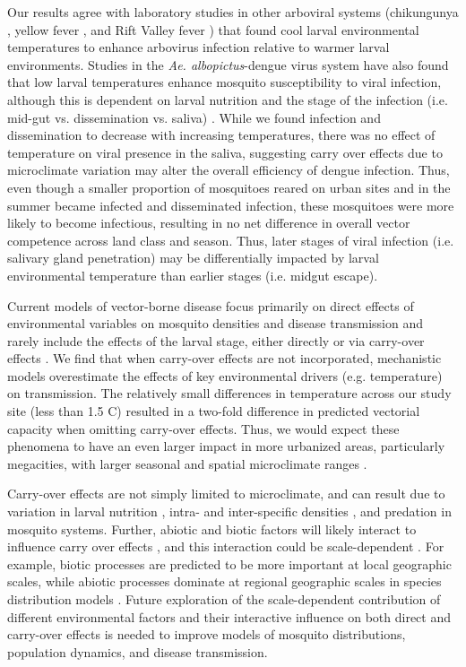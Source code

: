 \documentclass{bmcart}
\begin{document}
Our results agree with laboratory studies in other arboviral systems (chikungunya \citep{adelman2013}, yellow fever \citep{adelman2013}, and Rift Valley fever \citep{turell1993}) that found cool larval environmental temperatures to enhance arbovirus infection relative to warmer larval environments. Studies in the \textit{Ae. albopictus}-dengue virus system have also found that low larval temperatures enhance mosquito susceptibility to viral infection, although this is dependent on larval nutrition \citep{buckner2016} and the stage of the infection (i.e. mid-gut vs. dissemination vs. saliva) \citep{alto2013}. While we found infection and dissemination to decrease with increasing temperatures, there was no effect of temperature on viral presence in the saliva, suggesting carry over effects due to microclimate variation may alter the overall efficiency of dengue infection. Thus, even though a smaller proportion of mosquitoes reared on urban sites and in the summer became infected and disseminated infection, these mosquitoes were more likely to become infectious, resulting in no net difference in overall vector competence across land class and season. Thus, later stages of viral infection (i.e. salivary gland penetration) may be differentially impacted by larval environmental temperature than earlier stages (i.e. midgut escape).

Current models of vector-borne disease focus primarily on direct effects of environmental variables on mosquito densities and disease transmission and rarely include the effects of the larval stage, either directly or via carry-over effects \citep{reiner2013}. We find that when carry-over effects are not incorporated, mechanistic models overestimate the effects of key environmental drivers (e.g. temperature) on transmission. The relatively small differences in temperature across our study site (less than 1.5 \degree C) resulted in a two-fold difference in predicted vectorial capacity when omitting carry-over effects. Thus, we would expect these phenomena to have an even larger impact in more urbanized areas, particularly megacities, with larger seasonal and spatial microclimate ranges \citep{peng2012}.

Carry-over effects are not simply limited to microclimate, and can result due to variation in larval nutrition \citep{moller-jacobs2014}, intra- and inter-specific densities \citep{alto2005}, and predation \citep{roux2015a} in mosquito systems. Further, abiotic and biotic factors will likely interact to influence carry over effects \citep{buckner2016, muturi2012a}, and this interaction could be scale-dependent \citep{leisnham2014}. For example, biotic processes are predicted to be more important at local geographic scales, while abiotic processes dominate at regional geographic scales in species distribution models \citep{cohen2016}. Future exploration of the scale-dependent contribution of different environmental factors and their interactive influence on both direct and carry-over effects is needed to improve models of mosquito distributions, population dynamics, and disease transmission.
\end{document}
